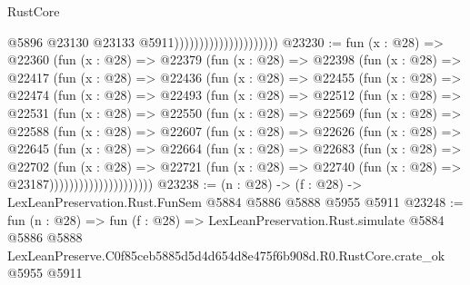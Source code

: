 \begin{lexlean}{RustCore}
\begin{coremodule}
                                              @5896
                                              @23130
                                              @23133
                                              @5911)))))))))))))))))))))
@23230 := fun (x : @28) =>
  @22360
    (fun (x : @28) =>
    @22379
      (fun (x : @28) =>
      @22398
        (fun (x : @28) =>
        @22417
          (fun (x : @28) =>
          @22436
            (fun (x : @28) =>
            @22455
              (fun (x : @28) =>
              @22474
                (fun (x : @28) =>
                @22493
                  (fun (x : @28) =>
                  @22512
                    (fun (x : @28) =>
                    @22531
                      (fun (x : @28) =>
                      @22550
                        (fun (x : @28) =>
                        @22569
                          (fun (x : @28) =>
                          @22588
                            (fun (x : @28) =>
                            @22607
                              (fun (x : @28) =>
                              @22626
                                (fun (x : @28) =>
                                @22645
                                  (fun (x : @28) =>
                                  @22664
                                    (fun (x : @28) =>
                                    @22683
                                      (fun (x : @28) =>
                                      @22702
                                        (fun (x : @28) =>
                                        @22721
                                          (fun (x : @28) =>
                                          @22740 (fun (x : @28) => @23187)))))))))))))))))))))
@23238 := (n : @28) -> (f : @28) -> LexLeanPreservation.Rust.FunSem @5884 @5886 @5888 @5955 @5911
@23248 := fun (n : @28) =>
  fun (f : @28) =>
  LexLeanPreservation.Rust.simulate
    @5884
    @5886
    @5888
    LexLeanPreserve.C0f85ceb5885d5d4d654d8e475f6b908d.R0.RustCore.crate_ok
    @5955
    @5911
\end{coremodule}
\end{lexlean}
